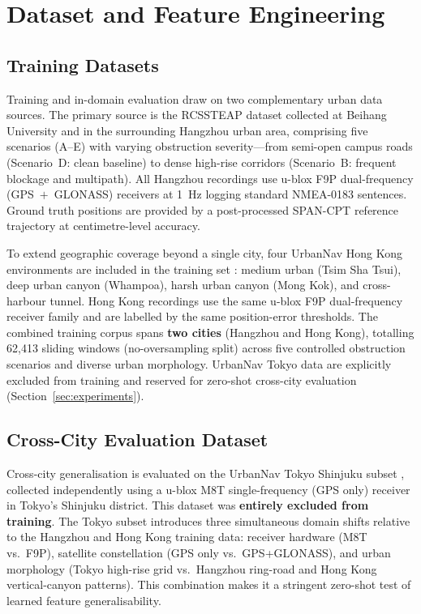\documentclass[pdflatex,sn-mathphys-num]{sn-jnl}
\begin{document}
\section{Dataset and Feature Engineering}\label{sec:dataset}

\subsection{Training Datasets}

Training and in-domain evaluation draw on two complementary urban data
sources.  The primary source is the RCSSTEAP dataset collected at Beihang
University and in the surrounding Hangzhou urban area, comprising five
scenarios (A--E) with varying obstruction severity---from semi-open campus
roads (Scenario~D: clean baseline) to dense high-rise corridors (Scenario~B:
frequent blockage and multipath).  All Hangzhou recordings use u-blox F9P
dual-frequency (GPS~$+$~GLONASS) receivers at 1~Hz logging standard
NMEA-0183 sentences.  Ground truth positions are provided by a post-processed
SPAN-CPT reference trajectory at centimetre-level accuracy.

To extend geographic coverage beyond a single city, four UrbanNav Hong Kong
environments are included in the training set
\cite{[AuthorYear_UrbanNav_dataset]}: medium urban (Tsim Sha Tsui), deep
urban canyon (Whampoa), harsh urban canyon (Mong Kok), and cross-harbour
tunnel.  Hong Kong recordings use the same u-blox F9P dual-frequency receiver
family and are labelled by the same position-error thresholds.  The combined
training corpus spans \textbf{two cities} (Hangzhou and Hong Kong), totalling
62,413 sliding windows (no-oversampling split) across five controlled
obstruction scenarios and diverse urban morphology.  UrbanNav Tokyo data are
explicitly excluded from training and reserved for zero-shot cross-city
evaluation (Section~\ref{sec:experiments}).

\subsection{Cross-City Evaluation Dataset}

Cross-city generalisation is evaluated on the UrbanNav Tokyo Shinjuku subset
\cite{[AuthorYear_UrbanNav_dataset]}, collected independently using a u-blox
M8T single-frequency (GPS only) receiver in Tokyo's Shinjuku district.
This dataset was \textbf{entirely excluded from training}.  The Tokyo subset
introduces three simultaneous domain shifts relative to the Hangzhou and
Hong Kong training data: receiver hardware (M8T vs.\ F9P), satellite
constellation (GPS only vs.\ GPS+GLONASS), and urban morphology (Tokyo
high-rise grid vs.\ Hangzhou ring-road and Hong Kong vertical-canyon
patterns).  This combination makes it a stringent zero-shot test of learned
feature generalisability.
\end{document}

